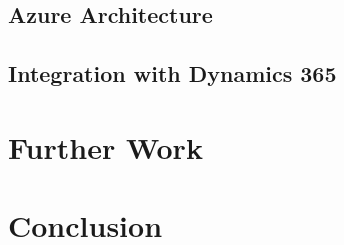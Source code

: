 \subsection{Azure Architecture}
\lipsum[2]

\subsection{Integration with Dynamics 365}
\lipsum[3]


\section{Further Work}
\lipsum[1]

\section{Conclusion}
\lipsum[1]